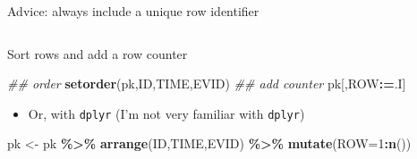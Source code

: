 \documentclass[
  8pt,
  ignorenonframetext,
  aspectratio=169]{beamer}
\newenvironment{Shaded}{\begin{snugshade}}{\end{snugshade}}
\newcommand{\CommentTok}[1]{\textcolor[rgb]{0.56,0.35,0.01}{\textit{#1}}}
\newcommand{\DataTypeTok}[1]{\textcolor[rgb]{0.13,0.29,0.53}{#1}}
\newcommand{\DecValTok}[1]{\textcolor[rgb]{0.00,0.00,0.81}{#1}}
\newcommand{\ErrorTok}[1]{\textcolor[rgb]{0.64,0.00,0.00}{\textbf{#1}}}
\newcommand{\KeywordTok}[1]{\textcolor[rgb]{0.13,0.29,0.53}{\textbf{#1}}}
\newcommand{\NormalTok}[1]{#1}
\newcommand{\OperatorTok}[1]{\textcolor[rgb]{0.81,0.36,0.00}{\textbf{#1}}}
\newcommand{\StringTok}[1]{\textcolor[rgb]{0.31,0.60,0.02}{#1}}
\providecommand{\tightlist}{%
  \setlength{\itemsep}{0pt}\setlength{\parskip}{0pt}}
\begin{document}
\begin{frame}[fragile]{Advice: always include a unique row identifier}
\begin{columns}[T]
\begin{column}{0.48\textwidth}
\begin{block}{Sort rows and add a row counter}
\begin{Shaded}
\begin{Highlighting}[]
\CommentTok{\#\# order}
\KeywordTok{setorder}\NormalTok{(pk,ID,TIME,EVID)}
\CommentTok{\#\# add counter}
\NormalTok{pk[,ROW}\OperatorTok{:}\ErrorTok{=}\NormalTok{.I]}
\end{Highlighting}
\end{Shaded}

\begin{itemize}
\tightlist
\item
  Or, with \texttt{dplyr} (I'm not very familiar with \texttt{dplyr})
\end{itemize}

\begin{Shaded}
\begin{Highlighting}[]
\NormalTok{pk \textless{}{-}}\StringTok{ }\NormalTok{pk }\OperatorTok{\%\textgreater{}\%}
\StringTok{    }\KeywordTok{arrange}\NormalTok{(ID,TIME,EVID) }\OperatorTok{\%\textgreater{}\%}
\StringTok{    }\KeywordTok{mutate}\NormalTok{(}\DataTypeTok{ROW=}\DecValTok{1}\OperatorTok{:}\KeywordTok{n}\NormalTok{())}
\end{Highlighting}
\end{Shaded}
\end{block}
\end{column}
\end{columns}
\end{frame}
\end{document}
